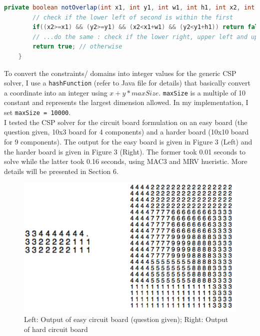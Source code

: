 \documentclass[9.5pt]{extarticle}
\begin{document}
\begin{lstlisting}[language=java,caption={notOverlap}]
    private boolean notOverlap(int x1, int y1, int w1, int h1, int x2, int y2, int w2, int h2){
        // check if the lower left of second is within the first
        if((x2>=x1) && (y2>=y1) && (x2<x1+w1) && (y2<y1+h1)) return false;
        // ...do the same : check if the lower right, upper left and upper right of the second is within the first, refer to java code for details
        return true; // otherwise
    }
\end{lstlisting} 


To convert the constraints/ domains into integer values for the generic CSP solver, I use a \verb`hashFunction` (refer to Java file for details) that basically convert a coordinate into an integer using $ x + y*maxSize$. \verb`maxSize` is a multiple of 10 constant and represents the largest dimension allowed. In my implementation, I set \verb`maxSize = 10000`.\\

I tested the CSP solver for the circuit board formulation on an easy board (the question given, 10x3 board for 4 components) and a harder board (10x10 board for 9 components). The output for the easy board is given in Figure 3 (Left) and the harder board is given in Figure 3 (Right). The former took 0.01 seconds to solve while the latter took 0.16 seconds, using MAC3 and MRV hueristic. More details will be presented in Section 6.

\begin{figure}[H]
\centering
\includegraphics[scale=0.7]{circuit.png}
\caption{Left: Output of easy circuit board (question given); Right: Output of hard circuit board}
\label{Figure 2}
\end{figure}
\end{document}
